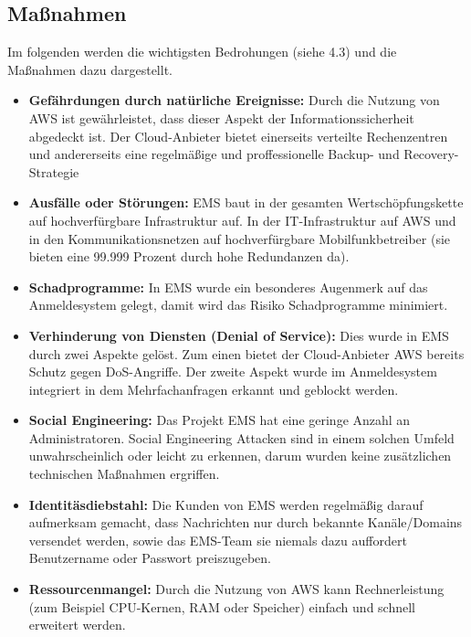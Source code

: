 \subsection{Maßnahmen}
Im folgenden werden die wichtigsten Bedrohungen (siehe 4.3) und die Maßnahmen dazu dargestellt.
\begin{itemize}
	\item \textbf{Gefährdungen durch natürliche Ereignisse:} Durch die Nutzung von AWS ist gewährleistet, dass dieser Aspekt der Informationssicherheit abgedeckt ist. Der Cloud-Anbieter bietet einerseits verteilte Rechenzentren und andererseits eine regelmäßige und proffessionelle Backup- und Recovery-Strategie
	\item \textbf{Ausfälle oder Störungen:} EMS baut in der gesamten Wertschöpfungskette auf hochverfürgbare Infrastruktur auf. In der IT-Infrastruktur auf AWS und in den Kommunikationsnetzen auf hochverfürgbare Mobilfunkbetreiber (sie bieten eine 99.999 Prozent durch hohe Redundanzen da).
	\item \textbf{Schadprogramme:} In EMS wurde ein besonderes Augenmerk auf das Anmeldesystem gelegt, damit wird das Risiko Schadprogramme minimiert.
	\item \textbf{Verhinderung von Diensten (Denial of Service):} Dies wurde in EMS durch zwei Aspekte gelöst. Zum einen bietet der Cloud-Anbieter AWS bereits Schutz gegen DoS-Angriffe. Der zweite Aspekt wurde im Anmeldesystem integriert in dem Mehrfachanfragen erkannt und geblockt werden.
	\item \textbf{Social Engineering:} Das Projekt EMS hat eine geringe Anzahl an Administratoren. Social Engineering Attacken sind in einem solchen Umfeld unwahrscheinlich oder leicht zu erkennen, darum wurden keine zusätzlichen technischen Maßnahmen ergriffen.
	\item \textbf{Identitäsdiebstahl:} Die Kunden von EMS werden regelmäßig darauf aufmerksam gemacht, dass Nachrichten nur durch bekannte Kanäle/Domains versendet werden, sowie das EMS-Team sie niemals dazu auffordert Benutzername oder Passwort preiszugeben.
	\item \textbf{Ressourcenmangel:} Durch die Nutzung von AWS kann Rechnerleistung (zum Beispiel CPU-Kernen, RAM oder Speicher) einfach und schnell erweitert werden.
\end{itemize}


\newpage